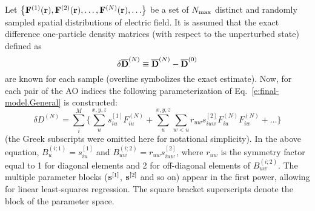 \documentclass[aip,jcp,preprint,amsmath,amssymb,floatfix]{revtex4-1}
\begin{document}
Let $\left\{ {\bf F}^{(1)}({\bf r}), {\bf F}^{(2)}({\bf r}), \ldots, {\bf F}^{(N)}({\bf r}), \ldots \right\}$ 
be a set of $N_{\rm max}$ distinct and randomly sampled 
spatial distributions of electric field. It is assumed that
the exact difference one\hyp{}particle density matrices (with respect to the unperturbed state)
defined as
%
\begin{equation}
 \delta \overline{\bf D}^{(N)} \equiv \overline{\bf D}^{(N)} - \overline{\bf D}^{(0)}
\end{equation}
%
are known for each sample (overline symbolizes the exact estimate).
Now, for each pair of the AO indices the following 
parameterization of Eq.~\eqref{e:final-model.General} is constructed:
%
\begin{equation}\label{e:final-model.General.Parameters}
 \delta D^{(N)} = \sum_{i }^M \Big\{ 
                              \sum_u^{x,y,z} s^{[1]}_{iu} F_{iu}^{(N)} %
                +             \sum_{u}^{x,y,z} \sum_{w<u} r_{uw} s^{[2]}_{iuw} F_{iu}^{(N)} F_{iw}^{(N)} 
                        + \ldots \Big\}
\end{equation}
%
(the Greek subscripts were omitted here for notational simplicity).
In the above equation, $B_u^{(i;1)} = s^{[1]}_{iu}$ and $B_{uw}^{(i;2)} = r_{uw} s^{[2]}_{iuw}$,
where $r_{uw}$ is the symmetry factor equal to 1 for diagonal elements and 2 for off\hyp{}diagonal
elements of $B_{uw}^{(i;2)}$.
The multiple parameter blocks
(${\bf s}^{[1]}$, ${\bf s}^{[2]}$ and so on)
appear in the first power, allowing for linear least\hyp{}squares regression.
The square bracket superscripts denote the block of the parameter space. 
\end{document}
